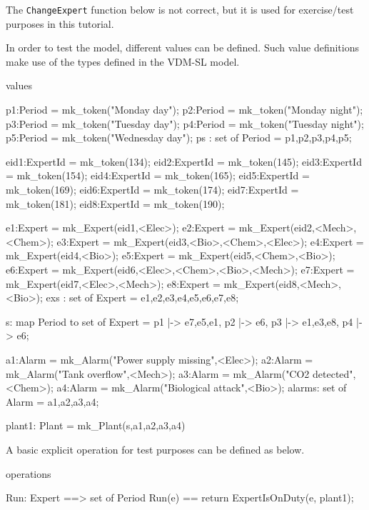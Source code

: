 The \texttt{ChangeExpert} function below is not correct, but it is used for exercise/test purposes in this tutorial.

\begin{vdmsl}
functions

ChangeExpert: Plant * Expert * Expert * Period -> Plant
ChangeExpert(mk_Plant(plan,alarms),ex1,ex2,peri) ==
  mk_Plant(plan ++ {peri |-> plan(peri)\{ex1} union {ex2}},
           alarms)
\end{vdmsl}

In order to test the model, different values can be defined. Such value definitions make use of the types defined in the VDM-SL model.


\begin{vdmsl}
values
 
  p1:Period = mk_token("Monday day");
  p2:Period = mk_token("Monday night");
  p3:Period = mk_token("Tuesday day");
  p4:Period = mk_token("Tuesday night");
  p5:Period = mk_token("Wednesday day");
  ps : set of Period = {p1,p2,p3,p4,p5};

  eid1:ExpertId = mk_token(134);
  eid2:ExpertId = mk_token(145);
  eid3:ExpertId = mk_token(154);
  eid4:ExpertId = mk_token(165);
  eid5:ExpertId = mk_token(169);
  eid6:ExpertId = mk_token(174);
  eid7:ExpertId = mk_token(181);
  eid8:ExpertId = mk_token(190);
  
  e1:Expert = mk_Expert(eid1,{<Elec>});
  e2:Expert = mk_Expert(eid2,{<Mech>,<Chem>});
  e3:Expert = mk_Expert(eid3,{<Bio>,<Chem>,<Elec>});
  e4:Expert = mk_Expert(eid4,{<Bio>});
  e5:Expert = mk_Expert(eid5,{<Chem>,<Bio>});
  e6:Expert = mk_Expert(eid6,{<Elec>,<Chem>,<Bio>,<Mech>});
  e7:Expert = mk_Expert(eid7,{<Elec>,<Mech>});
  e8:Expert = mk_Expert(eid8,{<Mech>,<Bio>});
  exs : set of Expert = {e1,e2,e3,e4,e5,e6,e7,e8};

  s: map Period to set of Expert
     = {p1 |-> {e7,e5,e1},
        p2 |-> {e6},
        p3 |-> {e1,e3,e8},
        p4 |-> {e6}};

  a1:Alarm = mk_Alarm("Power supply missing",<Elec>);
  a2:Alarm = mk_Alarm("Tank overflow",<Mech>);
  a3:Alarm = mk_Alarm("CO2 detected",<Chem>);
  a4:Alarm = mk_Alarm("Biological attack",<Bio>);
  alarms: set of Alarm = {a1,a2,a3,a4};

  plant1: Plant = mk_Plant(s,{a1,a2,a3,a4})
\end{vdmsl}  

A basic explicit operation for test purposes can be defined as below.

\begin{vdmsl}  
operations

Run: Expert ==> set of Period
Run(e) == return ExpertIsOnDuty(e, plant1);
\end{vdmsl}

